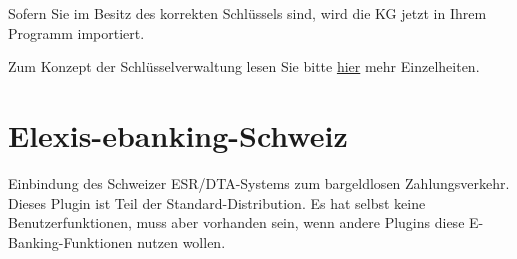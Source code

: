 Sofern Sie im Besitz des korrekten Schlüssels sind, wird die KG jetzt in Ihrem Programm importiert.

Zum Konzept der Schlüsselverwaltung lesen Sie bitte \href{http://www.elexis.ch/jp/index.php?option=content&task=view&id=64}{hier} mehr Einzelheiten.

\section{Elexis-ebanking-Schweiz}
Einbindung des Schweizer ESR/DTA-Systems zum bargeldlosen Zahlungsverkehr. Dieses Plugin ist Teil der Standard-Distribution. Es hat selbst keine Benutzerfunktionen, muss aber vorhanden sein, wenn andere Plugins diese E-Banking-Funktionen nutzen wollen.
